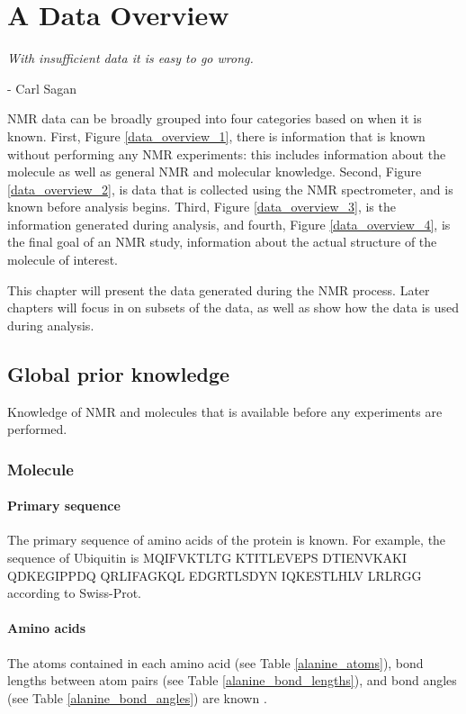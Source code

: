 \chapter{A Data Overview}
\label{ch_data_overview}

\begin{center}
  \textit{With insufficient data it is easy to go wrong.}

 - Carl Sagan
\end{center}

NMR data can be broadly grouped into four categories based on when it
is known.  First, Figure \ref{data_overview_1}, 
there is information that is known without performing
any NMR experiments: this includes information about the molecule as well
as general NMR and molecular knowledge.  Second,
Figure \ref{data_overview_2}, is data that is 
collected using the NMR spectrometer, and is known before analysis begins.  
Third, Figure \ref{data_overview_3}, is the information generated during 
analysis, and fourth, Figure \ref{data_overview_4}, is the final goal of 
an NMR study, information about the actual structure of the molecule of 
interest.

This chapter will present the data generated during the NMR process.
Later chapters will focus in on subsets of the data, as well as show how
the data is used during analysis.


\section{Global prior knowledge}
Knowledge of NMR and molecules that is available before any experiments are
performed.

\subsection*{Molecule}

\subsubsection{Primary sequence}
The primary sequence of amino acids of the protein is known. For example, the 
sequence of Ubiquitin is 
MQIFVKTLTG KTITLEVEPS DTIENVKAKI QDKEGIPPDQ QRLIFAGKQL EDGRTLSDYN IQKESTLHLV LRLRGG
according to Swiss-Prot.

\subsubsection{Amino acids}
The atoms contained in each amino acid (see Table \ref{alanine_atoms}), 
bond lengths between atom pairs (see Table \ref{alanine_bond_lengths}), 
and bond angles (see Table \ref{alanine_bond_angles}) are known 
\cite{alanine_sreepad}.

